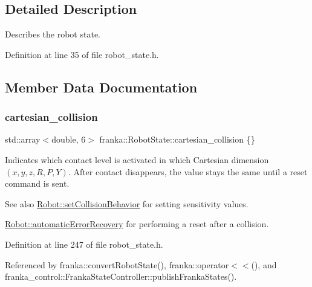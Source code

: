 \subsection{Detailed Description}
Describes the robot state. 

Definition at line 35 of file robot\+\_\+state.\+h.



\subsection{Member Data Documentation}
\mbox{\label{structfranka_1_1RobotState_a52c20478f4c1e162df38582ea9bda044}} 
\subsubsection{\texorpdfstring{cartesian\+\_\+collision}{cartesian\_collision}}
{\footnotesize\ttfamily std\+::array$<$double, 6$>$ franka\+::\+Robot\+State\+::cartesian\+\_\+collision \{\}}

Indicates which contact level is activated in which Cartesian dimension $(x,y,z,R,P,Y)$. After contact disappears, the value stays the same until a reset command is sent.

\begin{DoxySeeAlso}{See also}
\hyperlink{classfranka_1_1Robot_a168e1214ac36d74ac64f894332b84534}{Robot\+::set\+Collision\+Behavior} for setting sensitivity values. 

\hyperlink{classfranka_1_1Robot_af682aa673415718715bd859116bc2fed}{Robot\+::automatic\+Error\+Recovery} for performing a reset after a collision. 
\end{DoxySeeAlso}


Definition at line 247 of file robot\+\_\+state.\+h.



Referenced by franka\+::convert\+Robot\+State(), franka\+::operator$<$$<$(), and franka\+\_\+control\+::\+Franka\+State\+Controller\+::publish\+Franka\+States().

\mbox{\label{structfranka_1_1RobotState_a7fc1f0358d2104d39d301d70544fa6c1}} 
